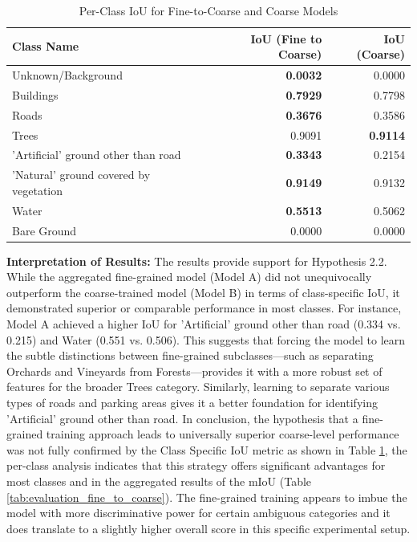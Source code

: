 \documentclass{report}
\begin{document}
\begin{table}[H]
\centering
\caption{Per-Class IoU for Fine-to-Coarse and Coarse Models}
\label{tab:per_class_iou_fine_coarse}
\begin{tabular}{lrr}
\toprule
                            Class Name &  IoU (Fine to Coarse) &  IoU (Coarse) \\
\midrule
                    Unknown/Background &                \textbf{0.0032} &        0.0000 \\
                             Buildings &                \textbf{0.7929} &        0.7798 \\
                                 Roads &                \textbf{0.3676} &        0.3586 \\
                                 Trees &                0.9091 &        \textbf{0.9114} \\
   'Artificial' ground other than road &                \textbf{0.3343} &        0.2154 \\
'Natural' ground covered by vegetation &                \textbf{0.9149} &        0.9132 \\
                                 Water &                \textbf{0.5513} &        0.5062 \\
                           Bare Ground &                0.0000 &        0.0000 \\
\bottomrule
\end{tabular}
\end{table}

\textbf{Interpretation of Results:}
The results provide support for Hypothesis 2.2. While the aggregated fine-grained model (Model A) did not unequivocally outperform the coarse-trained model (Model B) in terms of class-specific IoU, it demonstrated superior or comparable performance in most classes. For instance, Model A achieved a higher IoU for 'Artificial' ground other than road (0.334 vs. 0.215) and Water (0.551 vs. 0.506).
This suggests that forcing the model to learn the subtle distinctions between fine-grained subclasses—such as separating Orchards and Vineyards from Forests—provides it with a more robust set of features for the broader Trees category. Similarly, learning to separate various types of roads and parking areas gives it a better foundation for identifying 'Artificial' ground other than road.
In conclusion, the hypothesis that a fine-grained training approach leads to universally superior coarse-level performance was not fully confirmed by the Class Specific IoU metric as shown in Table \ref{tab:per_class_iou_fine_coarse}, the per-class analysis indicates that this strategy offers significant advantages for most classes and in the aggregated results of the mIoU (Table \ref{tab:evaluation_fine_to_coarse}). The fine-grained training appears to imbue the model with more discriminative power for certain ambiguous categories and it does translate to a slightly higher overall score in this specific experimental setup. 
\clearpage %
\end{document}
